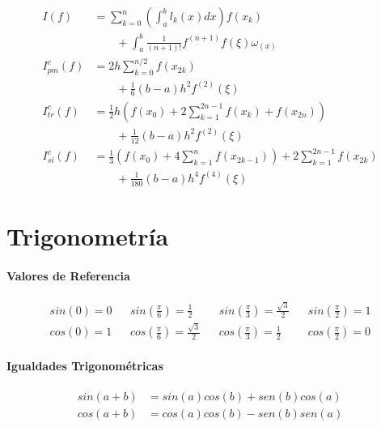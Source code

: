 \documentclass{article}
\begin{document}
\begin{multicols}{2}
        \begin{align*}
          I(f) &= \sum_{k=0}^n \left(\int_a^bl_k(x) dx \right) f(x_k) \\
                        & \quad \quad + \int_a^b \frac{1}{(n+1)!}f^{(n+1)}f(\xi)\omega_(x)\\
          I_{pm} ^ c(f) &= 2h\sum_{k=0}^{n/2}f\left(x_{2k}\right) \\
                        & \quad \quad + \frac{1}{6}(b-a)h^2f^{(2)}(\xi) \\
          I_{tr} ^ c(f) &= \frac{1}{2}h(f(x_0) + 2 \sum_{k=1}^{2n-1} f(x_k) + f(x_{2n})) \\
                        & \quad \quad +  \frac{1}{12} (b-a)h^2f^{(2)}(\xi) \\
          I_{si} ^ c(f) &=  \frac{1}{3} (f(x_0) + 4 \sum_{k=1}^nf(x_{2k-1})) + 2 \sum_{k=1}^{2n-1} f(x_{2k})\\
                        & \quad \quad +  \frac{1}{180} (b-a)h^4f^{(4)}(\xi)
        \end{align*}

    \appendix
    \section{Trigonometría}

      \paragraph{Valores de Referencia}

      \begin{align*}
        sin\left(0\right) = 0 &&
        sin\left(\frac{\pi}{6}\right) = \frac{1}{2} &&
        sin\left(\frac{\pi}{3}\right) = \frac{\sqrt{3}}{2} &&
        sin\left(\frac{\pi}{2}\right) = 1 \\
        cos\left(0\right) = 1 &&
        cos\left(\frac{\pi}{6}\right) = \frac{\sqrt{3}}{2} &&
        cos\left(\frac{\pi}{3}\right) = \frac{1}{2} &&
        cos\left(\frac{\pi}{2}\right) = 0
      \end{align*}

      \paragraph{Igualdades Trigonométricas}

      \begin{align*}
        sin(a + b) &= sin(a)cos(b) + sen(b)cos(a) \\
        cos(a + b) &= cos(a)cos(b) - sen(b)sen(a)
      \end{align*}


  \end{multicols}
\end{document}
